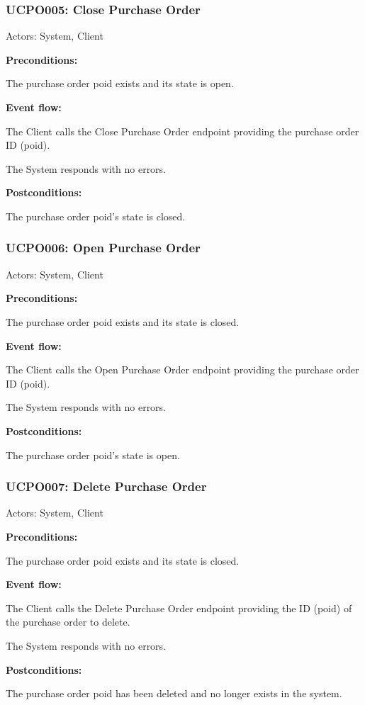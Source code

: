 \begin{ucbox}{\subsubsection{UCPO005: Close Purchase Order}}
\label{UCPO005}

Actors: System, Client

\textbf{Preconditions:}

\ucitem The purchase order poid exists and its state is open.

\textbf{Event flow:}

\ucitem The Client calls the Close Purchase Order endpoint providing the purchase order ID (poid).

\ucitem The System responds with no errors.

\textbf{Postconditions:}

\ucitem The purchase order poid’s state is closed.

\end{ucbox}

\begin{ucbox}{\subsubsection{UCPO006: Open Purchase Order}}
\label{UCPO006}

Actors: System, Client

\textbf{Preconditions:}

\ucitem The purchase order poid exists and its state is closed.

\textbf{Event flow:}

\ucitem The Client calls the Open Purchase Order endpoint providing the purchase order ID (poid).

\ucitem The System responds with no errors.

\textbf{Postconditions:}

\ucitem The purchase order poid’s state is open.

\end{ucbox}

\begin{ucbox}{\subsubsection{UCPO007: Delete Purchase Order}}
\label{UCPO007}

Actors: System, Client

\textbf{Preconditions:}

\ucitem The purchase order poid exists and its state is closed.

\textbf{Event flow:}

\ucitem The Client calls the Delete Purchase Order endpoint providing the ID (poid) of the purchase order to delete.

\ucitem The System responds with no errors.

\textbf{Postconditions:}

\ucitem The purchase order poid has been deleted and no longer exists in the system.

\end{ucbox}


